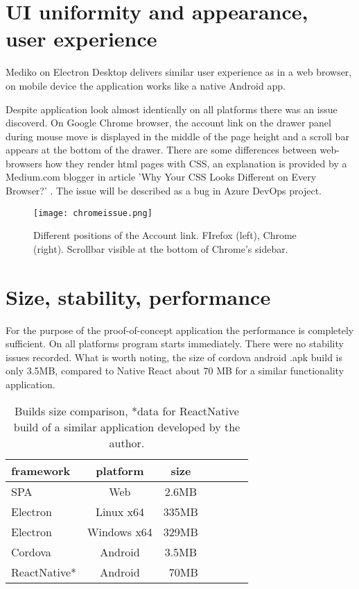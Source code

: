 \section{{UI uniformity and appearance, user experience}}%
\label{sec:appseveluation}
Mediko on Electron Desktop delivers similar user experience as in a web browser, on mobile device the application works like a native Android app.

Despite application look almost identically on all platforms there was an issue discoverd. On Google Chrome browser, the account link on the drawer panel during mouse move is displayed in the middle of the page height and a scroll bar appears at the bottom of the drawer. There are some differences between web-browsers how they render html pages with CSS, an explanation is provided by a Medium.com blogger in article 'Why Your CSS Looks Different on Every Browser?' \autocite{MediumCSS}. The issue will be described as a bug in Azure DevOps project.

\begin{figure}[H]
    \centering
    \texttt{[image: chromeissue.png]}
    \caption[CSS rendering issue]{\label{fig:chromeissue} Different positions of the Account link. FIrefox (left), Chrome (right). Scrollbar visible at the bottom of Chrome's sidebar.}
\end{figure}

\section{{Size, stability, performance}}%
\label{sec:sizeapps}
For the purpose of the proof-of-concept application the performance is completely sufficient. On all platforms program starts immediately. There were no stability issues recorded. What is worth noting, the size of cordova android .apk build is only 3.5MB, compared to Native React about 70 MB for a similar functionality application.

\begin{table}[H]
    \centering
    \begin{tabular}{lcccccc}
        \toprule
        framework & platform & size \\
        \midrule
        SPA  &  Web  &  2.6MB   \\
        Electron  &  Linux x64  &  335MB   \\
        Electron  &  Windows x64  &  329MB   \\
        Cordova  &  Android  &  3.5MB   \\
        ReactNative*  &  Android  &  ~70MB   \\

 
        \bottomrule
\end{tabular}
\caption[Builds size comparison]{\label{tab:builds_size}Builds size comparison, *data for ReactNative build of a similar application developed by the author.
}
\end{table}


